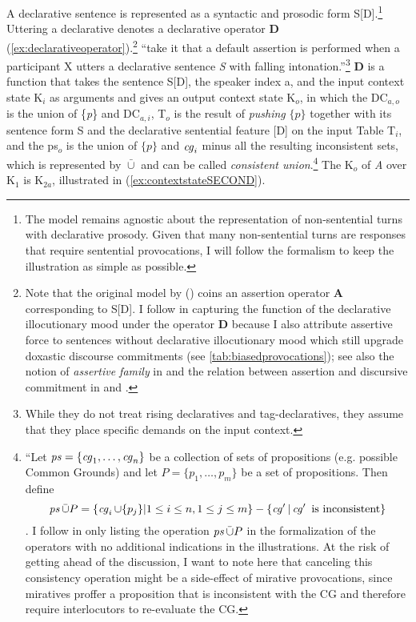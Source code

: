A declarative sentence is represented as a syntactic and prosodic form S[D].\footnote{The model remains agnostic about the representation of non-sentential turns with declarative prosody. Given that many non-sentential turns are responses that require sentential provocations, I will follow the \citeauthor{FarkasBruce.2010} formalism to keep the illustration as simple as possible.} Uttering a declarative denotes a declarative operator \textbf{D} (\ref{ex:declarativeoperator}).\footnote{Note that the original model by \citeauthor{FarkasBruce.2010} (\citeyear{FarkasBruce.2010}) coins an assertion operator \textbf{A} corresponding to S[D]. I follow \citet{Rett.2021emotivemarkers} in capturing the function of the declarative illocutionary mood under the operator \textbf{D} because I also attribute assertive force to sentences without declarative illocutionary mood which still upgrade doxastic discourse commitments (see \autoref{tab:biasedprovocations}); see also the notion of \textit{assertive family} in \citet[11--13]{Jary.2010} and  the relation between assertion and discursive commitment in \citet[157]{Brandom.19942001} and \citet[19--23]{Jary.2010}.} \citet[90]{FarkasBruce.2010} ``take it that a default assertion is performed when a participant X utters a declarative sentence \textit{S} with falling intonation.''\footnote{While they do not treat rising declaratives and tag-declaratives, they assume that they place specific demands on the input context.} \textbf{D} is a function that takes the sentence S[D], the speaker index a, and the input context state K$_{i}$ as arguments and gives an output context state K$_{o}$, in which the 
DC$_{a,o}$ is the union of \{\textit{p}\} and DC$_{a,i}$, T$_{o}$ is the result of \textit{pushing} $\{ p \}$ together with its sentence form S and the declarative sentential feature [D] on the input Table T$_{i}$, and the \ac{ps}$_{o}$ is the union of $\{ p \}$ and $\operatorname{\text{\textit{cg}}}_i$ minus all the 
resulting inconsistent sets, which is represented by $\bar{\cup}$ and can 
be called \textit{consistent union}.\footnote{``Let $\operatorname{\text{\textit{ps}}}= \{\operatorname{\text{\textit{cg}}}_1, \ldots, \operatorname{\text{\textit{cg}}}_n\}$ be a collection of sets of propositions (e.g. possible Common Grounds) and let $P = \{p_1, \ldots, p_m\}$ be a set of propositions. Then define \[\operatorname{\text{\textit{ps}}} \bar{\cup} P = \{\operatorname{\text{\textit{cg}}}_i \cup \{p_j\}| 1 \leq i \leq n, 1 \leq j \leq m\} - \{\operatorname{\text{\textit{cg}}}' | \operatorname{\text{\textit{cg}}}' \text{ is inconsistent}\}\] \citep[90]{FarkasBruce.2010}. I follow \citet{FarkasBruce.2010} in only listing the operation $\operatorname{\text{\textit{ps}}}\bar{\cup}P$ in the formalization of the operators with no additional indications in the illustrations. At the risk of getting ahead of the discussion, I want to note here that canceling this consistency operation might be a side-effect of mirative provocations, since miratives proffer a proposition that is inconsistent with the \ac{CG} and therefore require interlocutors to re-evaluate the \ac{CG}.} The K$_{o}$ of \textit{A} over K$_{1}$ is K$_{2a}$, illustrated in (\ref{ex:contextstateSECOND}).


